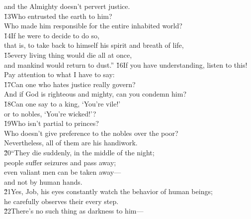 \begin{poetry}
\poemll    and the Almighty doesn't pervert justice. \\
\poeml \v{13}Who entrusted the earth to him? \\
\poemll    Who made him responsible for the entire inhabited world? \\
\poeml \v{14}If he were to decide to do so, \\
\poemll    that is, to take back to himself his spirit and breath of life, \\
\poeml \v{15}every living thing would die all at once, \\
\poemll    and mankind would return to dust.''
\poeml \v{16}If you have understanding, listen to this! \\
\poemll    Pay attention to what I have to say: \\
\poeml \v{17}Can one who hates justice really govern? \\
\poemll    And if God is righteous and mighty, can you condemn him? \\
\poeml \v{18}Can one say to a king, `You're vile!' \\
\poemll    or to nobles, `You're wicked!'? \\
\poeml \v{19}Who isn't partial to princes? \\
\poemll    Who doesn't give preference to the nobles over the poor? \\
\poemlll       Nevertheless, all of them are his handiwork. \\
\poeml \v{20}``They die suddenly, in the middle of the night; \\
\poemll    people suffer seizures and pass away; \\
\poeml even valiant men can be taken away--- \\
\poemll    and not by human hands. \\
\poeml \v{21}Yes, Job, his eyes constantly watch the behavior of human beings; \\
\poemll    he carefully observes their every step. \\
\poeml \v{22}There's no such thing as darkness to him--- \\

\end{poetry}
